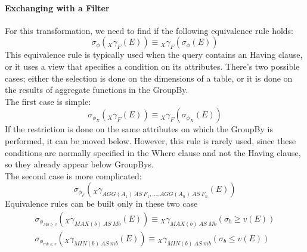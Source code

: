 \paragraph{Exchanging with a Filter}
For this transformation, we need to find if the following equivalence rule holds:
\begin{equation*}
    \sigma_{\phi}({}_X \gamma_F (E)) \equiv {}_X \gamma_F (\sigma_{\phi}(E))
\end{equation*}
This equivalence rule is typically used when the query contains an Having clause, or it uses a view that specifies a condition on its attributes. There's two possible cases; either the selection is done on the dimensions of a table, or it is done on the results of aggregate functions in the GroupBy. \\
The first case is simple:
\begin{equation*}
    \sigma_{\phi_X} ({}_X \gamma_F (E)) \equiv {}_X \gamma_F (\sigma_{\phi_X} (E))
\end{equation*}
If the restriction is done on the same attributes on which the GroupBy is performed, it can be moved below. However, this rule is rarely used, since these conditions are normally specified in the Where clause and not the Having clause, so they already appear below GroupBys. \\
The second case is more complicated:
\begin{equation*}
    \sigma_{\phi_F} ({}_X \gamma_{AGG(A_1) \ AS \ F_1, \dots, AGG(A_n) \ AS \ F_n} (E))
\end{equation*}
Equivalence rules can be built only in these two case
\begin{gather*}
    \sigma_{\phi_{Mb \geq v}} ({}_X \gamma_{MAX(b) \ AS \ Mb} (E)) \equiv {}_X \gamma_{MAX(b) \ AS \ Mb} (\sigma_{b} \geq v(E))\\
    \sigma_{\phi_{mb \leq v}} ({}_X \gamma_{MIN(b) \ AS \ mb} (E)) \equiv {}_X \gamma_{MIN(b) \ AS \ mb} (\sigma_{b} \leq v(E))
\end{gather*}